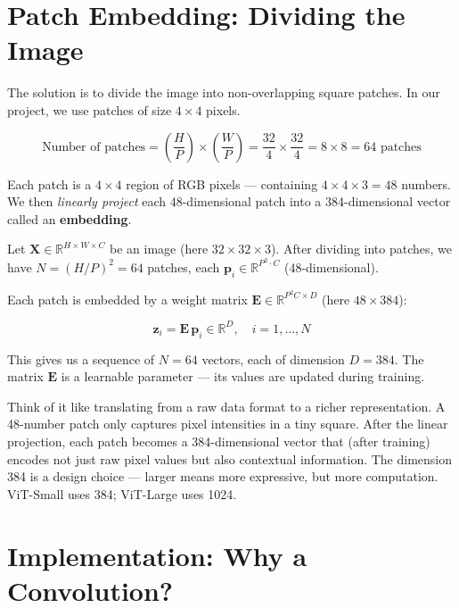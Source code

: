 \documentclass[12pt, a4paper]{report}
\newcommand{\R}{\mathbb{R}}
\newcommand{\mat}[1]{\mathbf{#1}}
\newcommand{\vect}[1]{\bm{#1}}
\begin{document}
\section{Patch Embedding: Dividing the Image}

The solution is to divide the image into non-overlapping square patches. In our project, we use patches of size $4 \times 4$ pixels.

\begin{equation}
\text{Number of patches} = \left(\frac{H}{P}\right) \times \left(\frac{W}{P}\right) = \frac{32}{4} \times \frac{32}{4} = 8 \times 8 = 64 \text{ patches}
\end{equation}

Each patch is a $4 \times 4$ region of RGB pixels — containing $4 \times 4 \times 3 = 48$ numbers. We then \emph{linearly project} each 48-dimensional patch into a 384-dimensional vector called an \textbf{embedding}.

\begin{mathbox}
Let $\mat{X} \in \R^{H \times W \times C}$ be an image (here $32 \times 32 \times 3$). After dividing into patches, we have $N = (H/P)^2 = 64$ patches, each $\vect{p}_i \in \R^{P^2 \cdot C}$ (48-dimensional).

Each patch is embedded by a weight matrix $\mat{E} \in \R^{P^2 C \times D}$ (here $48 \times 384$):

\begin{equation}
\vect{z}_i = \mat{E}\, \vect{p}_i \in \R^D, \quad i = 1, \ldots, N
\end{equation}

This gives us a sequence of $N = 64$ vectors, each of dimension $D = 384$. The matrix $\mat{E}$ is a learnable parameter — its values are updated during training.
\end{mathbox}

\begin{intuitionbox}
Think of it like translating from a raw data format to a richer representation. A 48-number patch only captures pixel intensities in a tiny square. After the linear projection, each patch becomes a 384-dimensional vector that (after training) encodes not just raw pixel values but also contextual information. The dimension 384 is a design choice — larger means more expressive, but more computation. ViT-Small uses 384; ViT-Large uses 1024.
\end{intuitionbox}

\section{Implementation: Why a Convolution?}
\end{document}
